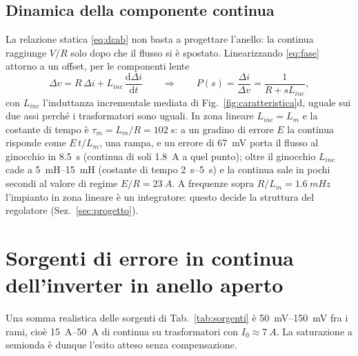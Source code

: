 \documentclass[10pt,a4paper]{scrartcl}
\newcommand{\dif}{\mathrm{d}}
\newcommand{\Lm}{L_m}
\newcommand{\Linc}{L_{inc}}
\newcommand{\Izero}{I_0}
\begin{document}
\begin{onehalfspace}
\subsection{Dinamica della componente continua}
\label{sec:dinamica}

La relazione statica \eqref{eq:dcab} non basta a progettare l'anello: la continua raggiunge $V/R$ solo dopo che il flusso si è spostato. Linearizzando \eqref{eq:fase} attorno a un offset, per le componenti lente
\begin{equation}
\Delta v = R\,\Delta i + \Linc\,\frac{\dif\Delta i}{\dif t} \qquad\Longrightarrow\qquad P(s) = \frac{\Delta i}{\Delta v} = \frac{1}{R + s\Linc},
\label{eq:impianto}
\end{equation}
con $\Linc$ l'induttanza incrementale mediata di Fig.~\ref{fig:caratteristica}d, uguale sui due assi perché i trasformatori sono uguali. In zona lineare $\Linc = \Lm$ e la costante di tempo è $\tau_m = \Lm/R = \SI{102}{s}$: a un gradino di errore $E$ la continua risponde come $E\,t/\Lm$, una rampa, e un errore di \SI{67}{mV} porta il flusso al ginocchio in \SI{8.5}{s} (continua di soli \SI{1.8}{A} a quel punto); oltre il ginocchio $\Linc$ cade a \SIrange{5}{15}{mH} (costante di tempo \SIrange{2}{5}{s}) e la continua sale in pochi secondi al valore di regime $E/R = \SI{23}{A}$. A frequenze sopra $R/\Lm = \SI{1.6}{mHz}$ l'impianto in zona lineare è un integratore: questo decide la struttura del regolatore (Sez.~\ref{sec:progetto}).

\section{Sorgenti di errore in continua dell'inverter in anello aperto}
\label{sec:sorgenti}

Una somma realistica delle sorgenti di Tab.~\ref{tab:sorgenti} è \SIrange{50}{150}{mV} fra i rami, cioè \SIrange{15}{50}{A} di continua su trasformatori con $\Izero \approx \SI{7}{A}$. La saturazione a semionda è dunque l'esito atteso senza compensazione.


\end{onehalfspace}
\end{document}
